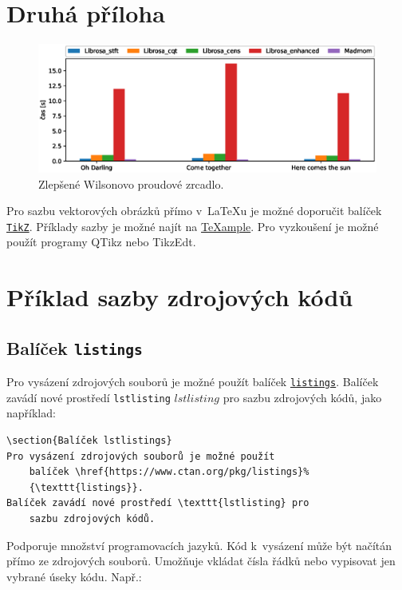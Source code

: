 \chapter{Druhá příloha}

\begin{figure}[!h]
  \begin{center}
    \includegraphics[scale=0.5]{obrazky/Chroma_analysis_times_comparison.eps}
  \end{center}
  \caption[Alenčino zrcadlo]{Zlepšené Wilsonovo proudové zrcadlo.}
\end{figure}

Pro sazbu vektorových obrázků přímo v~\LaTeX{}u je možné doporučit balíček \href{https://www.ctan.org/pkg/pgf}{\texttt{TikZ}}.
Příklady sazby je možné najít na \href{http://www.texample.net/tikz/examples/}{\TeX{}ample}.
Pro vyzkoušení je možné použít programy QTikz nebo TikzEdt.




\chapter{Příklad sazby zdrojových kódů}

\section{Balíček \texttt{listings}}

Pro vysázení zdrojových souborů je možné použít balíček \href{https://www.ctan.org/pkg/listings}{\texttt{listings}}.
Balíček zavádí nové prostředí \texttt{lstlisting} $lstlisting$ pro sazbu zdrojových kódů, jako například:
%
\begin{lstlisting}[language={[LaTeX]TeX}]
\section{Balíček lstlistings}
Pro vysázení zdrojových souborů je možné použít
	balíček \href{https://www.ctan.org/pkg/listings}%
	{\texttt{listings}}.
Balíček zavádí nové prostředí \texttt{lstlisting} pro
	sazbu zdrojových kódů.
\end{lstlisting}
%
Podporuje množství programovacích jazyků.
Kód k~vysázení může být načítán přímo ze zdrojových souborů.
Umožňuje vkládat čísla řádků nebo vypisovat jen vybrané úseky kódu.
Např.:

